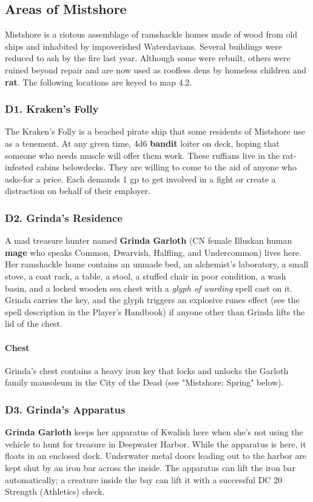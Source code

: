 \documentclass[10pt,a4paper,twoside,twocolumn,openany,nodeprecatedcode]{dndbook}
\begin{document}
\subsection{Areas of Mistshore}
Mistshore is a riotous assemblage of ramshackle homes made of wood from old ships and inhabited by impoverished Waterdavians. Several buildings were reduced to ash by the fire last year. Although some were rebuilt, others were ruined beyond repair and are now used as roofless dens by homeless children and \textbf{rat}.
The following locations are keyed to map 4.2.
\subsubsection{D1. Kraken's Folly}
The Kraken's Folly is a beached pirate ship that some residents of Mistshore use as a tenement. At any given time, 4d6 \textbf{bandit} loiter on deck, hoping that someone who needs muscle will offer them work. These ruffians live in the rat-infested cabins belowdecks. They are willing to come to the aid of anyone who asks-for a price. Each demands 1 gp to get involved in a fight or create a distraction on behalf of their employer.
\subsubsection{D2. Grinda's Residence}
A mad treasure hunter named \textbf{Grinda Garloth} (CN female Illuskan human \textbf{mage} who speaks Common, Dwarvish, Halfling, and Undercommon) lives here. Her ramshackle home contains an unmade bed, an alchemist's laboratory, a small stove, a coat rack, a table, a stool, a stuffed chair in poor condition, a wash basin, and a locked wooden sea chest with a \textit{glyph of warding} spell cast on it. Grinda carries the key, and the glyph triggers an explosive runes effect (see the spell description in the Player's Handbook) if anyone other than Grinda lifts the lid of the chest.
\paragraph{Chest}
Grinda's chest contains a heavy iron key that locks and unlocks the Garloth family mausoleum in the City of the Dead (see "Mistshore: Spring" below).
\subsubsection{D3. Grinda's Apparatus}
\textbf{Grinda Garloth} keeps her apparatus of Kwalish here when she's not using the vehicle to hunt for treasure in Deepwater Harbor. While the apparatus is here, it floats in an enclosed dock. Underwater metal doors leading out to the harbor are kept shut by an iron bar across the inside. The apparatus can lift the iron bar automatically; a creature inside the bay can lift it with a successful DC 20 Strength (Athletics) check.
\end{document}

